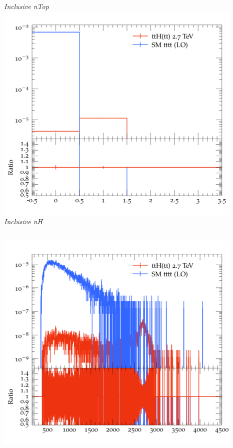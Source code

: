 \documentclass{beamer}
\begin{document}
\begin{frame}
\begin{columns}
\textit{\small Inclusive nTop}
\includegraphics[width=\textwidth]{../plots/ttH_2700/tttt_ttH/Inclusive_nH.png}\\
\textit{\small Inclusive nH}
\end{columns}
\begin{columns}
\includegraphics[width=\textwidth]{../plots/ttH_2700/tttt_ttH/Inclusive_InvM_ttbar12.png}\\

\end{columns}
\end{frame}
\end{document}
